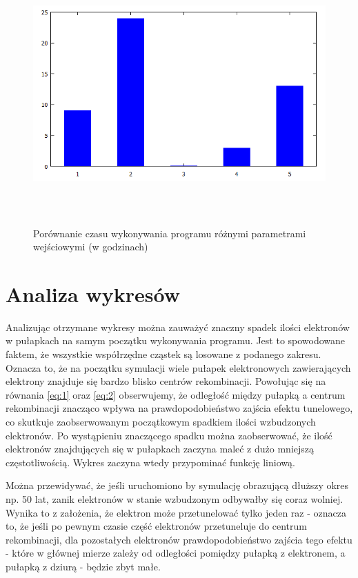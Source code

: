 \begin{figure}[H]
\centering
\includegraphics[width=17cm, height = 10cm]{czas}
\caption{Porównanie czasu wykonywania programu różnymi parametrami wejściowymi (w godzinach)}
\label{rys:1}
\end{figure}



\section{Analiza wykresów}
Analizując otrzymane wykresy można zauważyć znaczny spadek ilości elektronów w pułapkach na samym początku wykonywania programu. Jest to spowodowane faktem, że wszystkie współrzędne cząstek są losowane z podanego zakresu. Oznacza to, że na początku symulacji wiele pułapek elektronowych zawierających elektrony znajduje się bardzo blisko centrów rekombinacji. Powołując się na równania \ref{eq:1} oraz \ref{eq:2} obserwujemy, że odległość między pułapką a centrum rekombinacji znacząco wpływa na prawdopodobieństwo zajścia efektu tunelowego, co skutkuje zaobserwowanym początkowym spadkiem ilości wzbudzonych elektronów. Po wystąpieniu znaczącego spadku można zaobserwować, że ilość elektronów znajdujących się w pułapkach zaczyna maleć z dużo mniejszą częstotliwością. Wykres zaczyna wtedy przypominać funkcję liniową. 

Można przewidywać, że jeśli uruchomiono by symulację obrazującą dłuższy okres np. 50 lat, zanik elektronów w stanie wzbudzonym odbywałby się coraz wolniej. Wynika to z założenia, że elektron może przetunelować tylko jeden raz - oznacza to, że jeśli po pewnym czasie część elektronów przetuneluje do centrum rekombinacji, dla pozostałych elektronów prawdopodobieństwo zajścia tego efektu - które w głównej mierze zależy od odległości pomiędzy pułapką z elektronem, a pułapką z dziurą - będzie zbyt małe.

